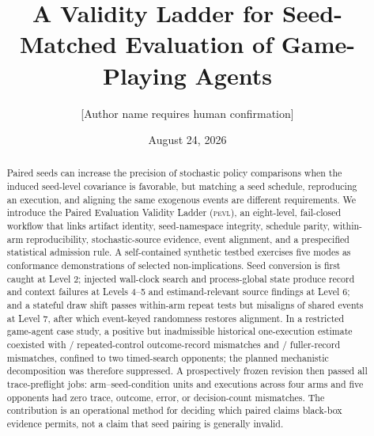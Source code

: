 \documentclass[aps,reprint,superscriptaddress,longbibliography,floatfix]{revtex4-2}
\newcommand{\PEVL}{\textsc{pevl}}
\begin{document}
\title{A Validity Ladder for Seed-Matched Evaluation of Game-Playing Agents}

\author{[Author name requires human confirmation]}
\date{August 24, 2026}

\begin{abstract}
Paired seeds can increase the precision of stochastic policy comparisons when
the induced seed-level covariance is favorable, but
matching a seed schedule, reproducing an execution, and aligning the same
exogenous events are different requirements.  We introduce the Paired
Evaluation Validity Ladder (\PEVL), an eight-level, fail-closed workflow that
links artifact identity, seed-namespace integrity, schedule parity,
within-arm reproducibility, stochastic-source evidence, event alignment, and a
prespecified statistical admission rule.  A self-contained synthetic testbed
exercises five modes as conformance demonstrations of selected
non-implications.  Seed conversion is first caught at Level 2; injected
wall-clock search and process-global state produce record and context failures
at Levels 4--5 and estimand-relevant source findings at Level 6; and a stateful
draw shift passes within-arm repeat tests but misaligns
\PEVLDrawShiftMisalignedEvents{} of \PEVLDrawShiftSharedEvents{} shared events
at Level 7, after which event-keyed randomness restores alignment.  In a
restricted game-agent case study, a positive but inadmissible historical
one-execution estimate coexisted with
\PEVLHistoricalOutcomeMismatch{}/\PEVLHistoricalUnits{} repeated-control
outcome-record mismatches and
\PEVLHistoricalSerializedMismatch{}/\PEVLHistoricalUnits{} fuller-record
mismatches, confined to two timed-search opponents; the planned mechanistic
decomposition was therefore suppressed.  A prospectively frozen revision then
passed all \PEVLPreflightJobs{} trace-preflight jobs:
\PEVLPreflightTrajectoryUnits{} arm--seed-condition units and
\PEVLPreflightExecutions{} executions across four arms and five opponents had
zero trace, outcome, error, or decision-count mismatches.
\ifdefined\PEVLTimedStressReady\PEVLTimedStressAbstractSentence\space\fi
\ifdefined\PEVLFactorialReady\PEVLFactorialAbstractSentence\space\fi
The contribution is an operational method for deciding which paired claims
black-box evidence permits, not a claim that seed pairing is generally invalid.
\end{abstract}

\maketitle
\end{document}
